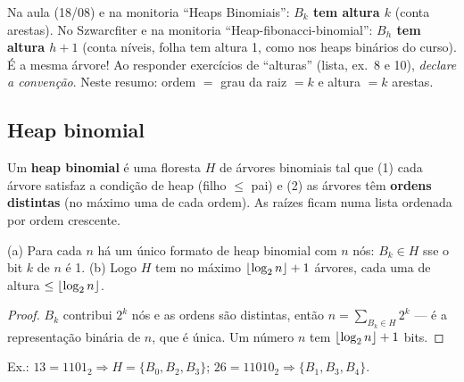 \begin{cuidado}
Na aula (18/08) e na monitoria ``Heaps Binomiais'': \textbf{$B_k$ tem altura $k$} (conta arestas). No Szwarcfiter e na monitoria ``Heap-fibonacci-binomial'': \textbf{$B_h$ tem altura $h+1$} (conta níveis, folha tem altura 1, como nos heaps binários do curso). É a mesma árvore! Ao responder exercícios de ``alturas'' (lista, ex.\ 8 e 10), \emph{declare a convenção}. Neste resumo: ordem $=$ grau da raiz $=k$ e altura $=k$ arestas.
\end{cuidado}

\subsection{Heap binomial}
\begin{defi}
Um \textbf{heap binomial} é uma floresta $H$ de árvores binomiais tal que (1) cada árvore satisfaz a condição de heap (filho $\le$ pai) e (2) as árvores têm \textbf{ordens distintas} (no máximo uma de cada ordem). As raízes ficam numa lista ordenada por ordem crescente.
\end{defi}

\begin{prop}
(a) Para cada $n$ há um único formato de heap binomial com $n$ nós: $B_k\in H$ sse o bit $k$ de $n$ é 1. (b) Logo $H$ tem no máximo $\lfloor\log_2 n\rfloor+1$ árvores, cada uma de altura $\le\lfloor\log_2n\rfloor$.
\end{prop}
\begin{proof}
$B_k$ contribui $2^k$ nós e as ordens são distintas, então $n=\sum_{B_k\in H}2^k$ --- é a representação binária de $n$, que é única. Um número $n$ tem $\lfloor\log_2 n\rfloor+1$ bits.
\end{proof}
\noindent Ex.: $13=1101_2\Rightarrow H=\{B_0,B_2,B_3\}$; $26=11010_2\Rightarrow\{B_1,B_3,B_4\}$.

